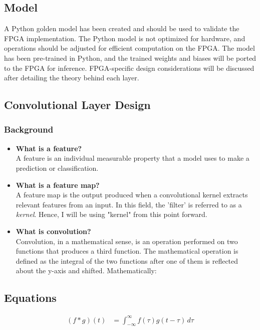 \documentclass{article}
\begin{document}
\subsection{Model}
A Python golden model has been created and should be used to validate the FPGA implementation. The Python model is not optimized for hardware, and operations should be adjusted for efficient computation on the FPGA. The model has been pre-trained in Python, and the trained weights and biases will be ported to the FPGA for inference. FPGA-specific design considerations will be discussed after detailing the theory behind each layer.

\subsection{Convolutional Layer Design}
\subsubsection{Background}
\begin{itemize}
  \item \textbf{What is a feature?} \\
    A feature is an individual measurable property that a model uses to make a prediction or classification.
  \item \textbf{What is a feature map?} \\
    A feature map is the output produced when a convolutional kernel extracts relevant features from an input. In this field, the 'filter' is referred to as a \emph{kernel}. Hence, I will be using "kernel" from this point forward.
  \item \textbf{What is convolution?} \\
    Convolution, in a mathematical sense, is an operation performed on two functions that produces a third function. The mathematical operation is defined as the integral of the two functions after one of them is reflected about the y-axis and shifted. Mathematically:
\end{itemize}

\subsection{Equations}
\begin{align*}
  \left( f  * g \right) \left( t \right) &= \int_{-\infty}^{\infty} f \left( \tau \right) g \left( t - \tau \right) \, d\tau
\end{align*}
\end{document}
